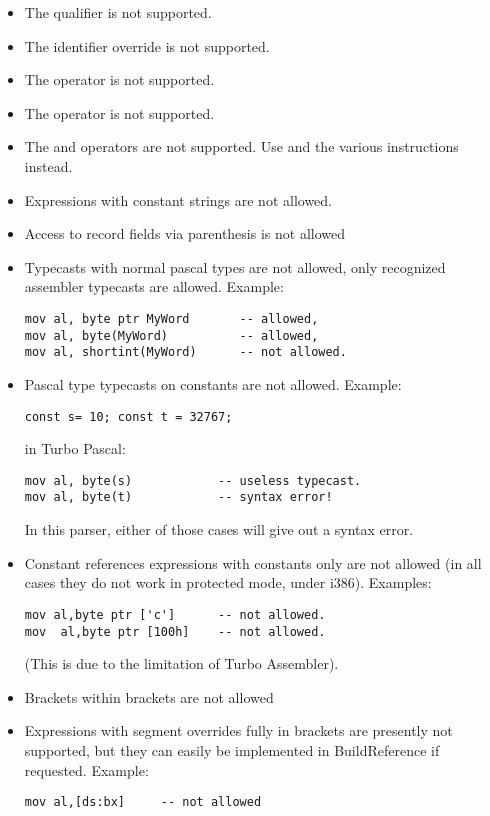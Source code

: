 \begin{itemize}
\item  The  qualifier is not supported.
\item  The \var{\&} identifier override is not supported.
\item  The  operator is not supported.
\item  The  operator is not supported.
\item  The  and  operators are not supported.
     Use  and the various  instructions instead.
\item  Expressions with constant strings are not allowed.
\item  Access to record fields via parenthesis is not allowed
\item  Typecasts with normal pascal types are not allowed, only
    recognized assembler typecasts are allowed. Example:
\begin{verbatim}
mov al, byte ptr MyWord       -- allowed,
mov al, byte(MyWord)          -- allowed,
mov al, shortint(MyWord)      -- not allowed.
\end{verbatim}
\item  Pascal type typecasts on constants are not allowed.
Example:
\begin{verbatim}
const s= 10; const t = 32767;
\end{verbatim}
in Turbo Pascal:
\begin{verbatim}
mov al, byte(s)            -- useless typecast.
mov al, byte(t)            -- syntax error!
\end{verbatim}
In this parser, either of those  cases will give out a syntax error.
\item  Constant references expressions with constants only are not
   allowed (in all cases they do not work in protected mode,
    under \linux i386). Examples:
\begin{verbatim}
mov al,byte ptr ['c']      -- not allowed.
mov  al,byte ptr [100h]    -- not allowed.
\end{verbatim}
 (This is due to the limitation of Turbo Assembler).
\item  Brackets within brackets are not allowed
\item  Expressions with segment overrides fully in brackets are
presently not supported, but they can easily be implemented
in BuildReference if requested. Example:
\begin{verbatim}
mov al,[ds:bx]     -- not allowed
\end{verbatim}

\end{itemize}
